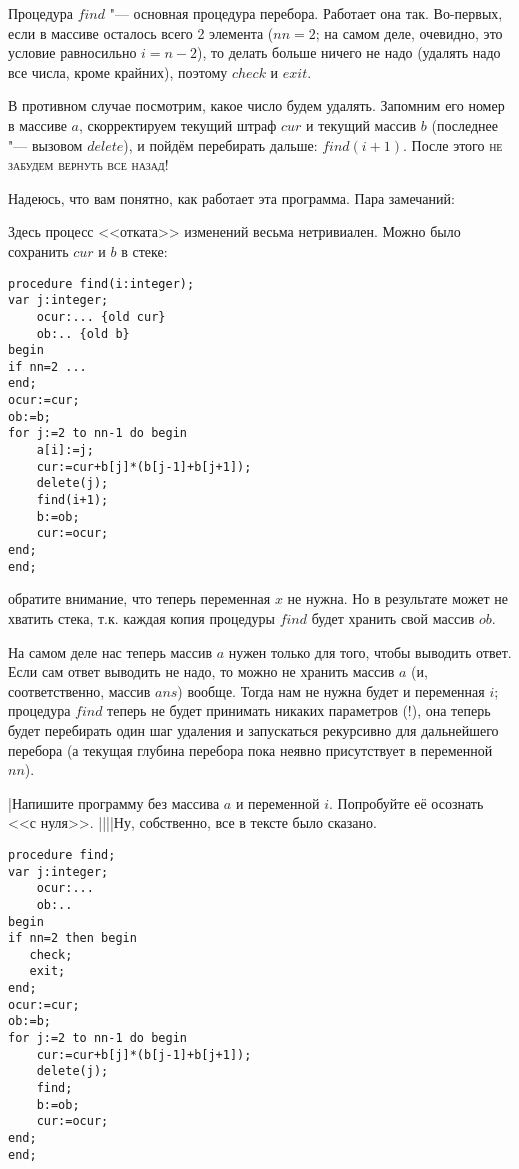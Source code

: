 Процедура $find$ "--- основная 
процедура перебора. Работает она так. Во-первых, если в массиве осталось всего 2 элемента ($nn=2$; на самом деле, 
очевидно, это условие равносильно $i=n-2$), то делать больше ничего не надо (удалять надо все 
числа, кроме крайних), поэтому $check$ и $exit$.

В противном случае посмотрим, какое число будем удалять. Запомним его номер в массиве $a$, 
скорректируем текущий штраф $cur$ и текущий массив $b$ (последнее "--- вызовом $delete$), и пойдём 
перебирать дальше: $find(i+1)$. После этого \textsc{не забудем вернуть все назад}!

Надеюсь, что вам понятно, как работает эта программа. Пара 
замечаний:
\begin{ulist}
\item Здесь процесс <<отката>> изменений весьма нетривиален. Можно было сохранить $cur$ и $b$ в стеке:
\begin{codesample}\begin{verbatim}
procedure find(i:integer);
var j:integer;
    ocur:... {old cur}
    ob:.. {old b}
begin
if nn=2 ...
end;
ocur:=cur;
ob:=b;
for j:=2 to nn-1 do begin
    a[i]:=j;
    cur:=cur+b[j]*(b[j-1]+b[j+1]);
    delete(j);
    find(i+1);
    b:=ob;
    cur:=ocur;
end;
end;
\end{verbatim}
\end{codesample}
обратите внимание, что теперь переменная $x$ не нужна.
Но в результате может не хватить стека, т.к. каждая копия процедуры $find$ будет хранить свой массив $ob$.
\item На самом деле нас теперь массив $a$ нужен только для того, чтобы выводить ответ. Если сам 
ответ выводить не надо, то можно не хранить массив $a$ (и, соответственно, массив $ans$) вообще. 
Тогда нам не нужна будет и переменная $i$; процедура $find$ теперь не будет принимать никаких параметров (!), она теперь будет перебирать один шаг удаления и запускаться рекурсивно для дальнейшего перебора (а текущая глубина перебора пока неявно присутствует в переменной $nn$).
\end{ulist}

\task|Напишите программу без массива $a$ и переменной $i$. Попробуйте её 
осознать <<с нуля>>.
||||Ну, собственно, все в тексте было сказано.
\begin{codesample}\begin{verbatim}
procedure find;
var j:integer;
    ocur:...
    ob:..
begin
if nn=2 then begin
   check;
   exit;
end;
ocur:=cur;
ob:=b;
for j:=2 to nn-1 do begin
    cur:=cur+b[j]*(b[j-1]+b[j+1]);
    delete(j);
    find;
    b:=ob;
    cur:=ocur;
end;
end;
\end{verbatim}
\end{codesample}


